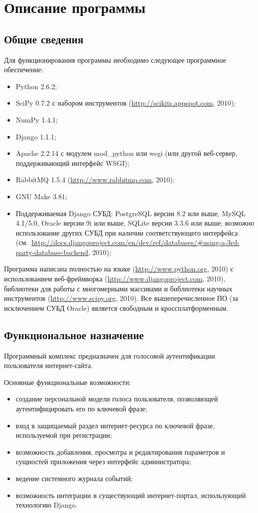 \section{Описание программы}
\subsection{Общие сведения}
\label{sec:soft_description:general}

Для функционирования программы необходимо следующее программное обеспечение:
\begin{itemize}
\item Python 2.6.2;
\item SciPy 0.7.2 с набором инструментов  (\url{http://scikits.appspot.com}, 2010);
\item NumPy 1.4.1;
\item Django 1.1.1;
\item Apache 2.2.14 с модулем mod\_python или wsgi (или другой веб-сервер,
поддерживающий интерфейс WSGI);
\item RabbitMQ 1.5.4 (\url{http://www.rabbitmq.com}, 2010);
\item GNU Make 3.81;
\item Поддерживаемая Django СУБД: PostgreSQL версии 8.2 или выше, MySQL 4.1/5.0, Oracle версии 9i или выше, SQLite версии 3.3.6 или выше; возможно использование других СУБД при наличии соответствующего интерфейса (см.~\url{http://docs.djangoproject.com/en/dev/ref/databases/#using-a-3rd-party-database-backend}, 2010);
\end{itemize}

Программа написана полностью на языке  (\url{http://www.python.org}, 2010) с использованием веб-фреймворка  (\url{http://www.djangoproject.com}, 2010), библиотеки для работы с многомерными массивами  и библиотеки научных инструментов  (\url{http://www.scipy.org}, 2010). Все вышеперечисленное ПО (за исключением СУБД Oracle) является свободным и кроссплатформенным.

\subsection{Функциональное назначение}

Программный комплекс предназначен для голосовой аутентификации пользователя
интернет-сайта.

Основные функциональные возможности:
\begin{itemize}
\item создание персональной модели голоса пользователя, позволяющей
аутентифицировать его по ключевой фразе;
\item вход в защищаемый раздел интернет-ресурса по ключевой фразе, используемой
при регистрации;
\item возможность добавления, просмотра и редактирования параметров и сущностей
приложения через интерфейс администратора;
\item ведение системного журнала событий;
\item возможность интеграции в существующий интернет-портал, использующий
технологию Django.
\end{itemize}

